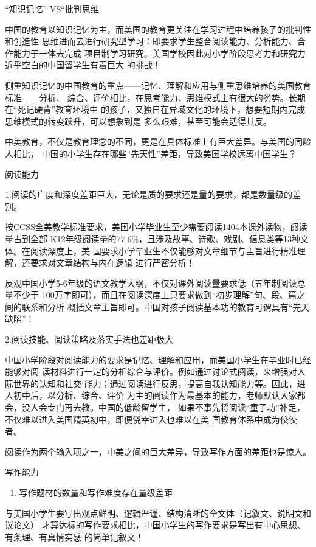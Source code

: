 \documentclass[11pt]{ctexart}
\begin{document}
{{{{“知识记忆” VS“批判思维

中国的教育以知识记忆为主，而美国的教育更关注在学习过程中培养孩子的批判性和创造性
思维进而去进行研究型学习：即要求学生整合阅读能力、分析能力、合作能力于一体去完成
项目制学习研究。美国学校因此对小学阶段思考力和研究力近乎空白的中国留学生有着巨大
的挑战！

侧重知识记忆的中国教育的重点——记忆、理解和应用与侧重思维培养的美国教育标准——分析、
综合、评价相比，在思考能力、思维模式上有很大的劣势。长期在“死记硬背”教育环境中
的孩子，又独自在异域文化的环境下，想要短期内完成思维模式的转变跃升，可以想象到是
多么艰难，甚至可能会适得其反。

中美教育，不仅是教育理念的不同，更是在具体标准上有巨大差异。与美国的同龄人相比，
中国的小学生存在哪些“先天性”差距，导致美国学校远离中国学生？

阅读能力

1.阅读的广度和深度差距巨大，无论是质的要求还是量的要求，都是数量级的差别。

按CCSS全美教学标准要求，美国小学毕业生至少需要阅读1404本课外读物，阅读量占到全部
K12年级阅读量的77.6\%，且涉及故事、诗歌、戏剧、信息类等13种文体。在阅读深度上，美
国要求小学毕业生不仅能够对文章细节与主旨进行精准理解，还要求对文章结构与内在逻辑
进行严密分析！

反观中国小学5-6年级的语文教学大纲，不仅对课外阅读量要求低（五年制阅读总量不少于
100万字即可），而且在阅读深度上只要求做到“初步理解”句、段、篇之间的联系和分析
概括文章主旨即可。中国对孩子阅读基本功的教育可谓具有“先天缺陷”！



2.阅读技能、阅读策略及落实手法也差距极大

中国小学阶段对阅读能力的要求是记忆、理解和应用，而美国小学生在毕业时已经能够对阅
读材料进行一定的分析综合与评价。例如通过讨论式阅读，来增强对人际世界的认知和社交
能力；通过阅读进行反思，提高自我认知能力等。因此，进入初中后，以分析、综合、评价
为主的阅读作为最基本的能力，老师默认大家都会，没人会专门再去教。中国的低龄留学生，
如果不事先将阅读“童子功”补足，不仅难以进入美国精英初中，即便侥幸进入也难以在美
国教育体系中成为佼佼者。

阅读作为两个输入项之一，中美之间的巨大差异，导致写作方面的差距也是惊人。

写作能力

\begin{enumerate}
\item 写作题材的数量和写作难度存在量级差距
\end{enumerate}

与美国小学生要写出观点鲜明、逻辑严谨、结构清晰的全文体（记叙文、说明文和议论文）
才算达标的写作要求相比，中国小学生的写作要求是写出有中心思想、有条理、有真情实感
的简单记叙文！

}}}}
\end{document}

